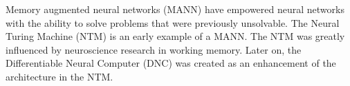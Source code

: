 Memory augmented neural networks (MANN) have empowered neural networks with the
ability to solve problems that were previously unsolvable. The Neural Turing
Machine (NTM) \cite{DBLP:journals/corr/GravesWD14} is an early example of a
MANN. The NTM was greatly influenced by neuroscience research in working
memory. Later on, the Differentiable Neural Computer (DNC)
\cite{graves2016hybrid} was created as an enhancement of the architecture
in the NTM.
